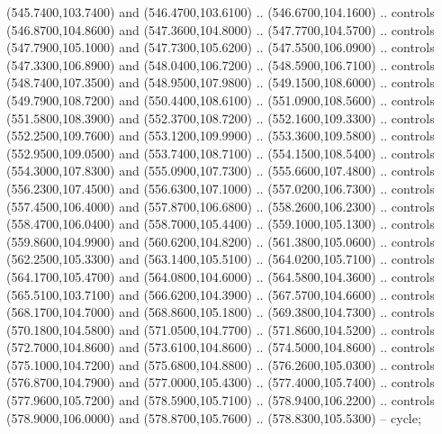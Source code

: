 {\begin{scope}[y=0.80pt, x=0.80pt, yscale=-1, xscale=1, inner sep=0pt, outer sep=0pt, #1]
      (545.7400,103.7400) and (546.4700,103.6100) .. (546.6700,104.1600) .. controls
      (546.8700,104.8600) and (547.3600,104.8000) .. (547.7700,104.5700) .. controls
      (547.7900,105.1000) and (547.7300,105.6200) .. (547.5500,106.0900) .. controls
      (547.3300,106.8900) and (548.0400,106.7200) .. (548.5900,106.7100) .. controls
      (548.7400,107.3500) and (548.9500,107.9800) .. (549.1500,108.6000) .. controls
      (549.7900,108.7200) and (550.4400,108.6100) .. (551.0900,108.5600) .. controls
      (551.5800,108.3900) and (552.3700,108.7200) .. (552.1600,109.3300) .. controls
      (552.2500,109.7600) and (553.1200,109.9900) .. (553.3600,109.5800) .. controls
      (552.9500,109.0500) and (553.7400,108.7100) .. (554.1500,108.5400) .. controls
      (554.3000,107.8300) and (555.0900,107.7300) .. (555.6600,107.4800) .. controls
      (556.2300,107.4500) and (556.6300,107.1000) .. (557.0200,106.7300) .. controls
      (557.4500,106.4000) and (557.8700,106.6800) .. (558.2600,106.2300) .. controls
      (558.4700,106.0400) and (558.7000,105.4400) .. (559.1000,105.1300) .. controls
      (559.8600,104.9900) and (560.6200,104.8200) .. (561.3800,105.0600) .. controls
      (562.2500,105.3300) and (563.1400,105.5100) .. (564.0200,105.7100) .. controls
      (564.1700,105.4700) and (564.0800,104.6000) .. (564.5800,104.3600) .. controls
      (565.5100,103.7100) and (566.6200,104.3900) .. (567.5700,104.6600) .. controls
      (568.1700,104.7000) and (568.8600,105.1800) .. (569.3800,104.7300) .. controls
      (570.1800,104.5800) and (571.0500,104.7700) .. (571.8600,104.5200) .. controls
      (572.7000,104.8600) and (573.6100,104.8600) .. (574.5000,104.8600) .. controls
      (575.1000,104.7200) and (575.6800,104.8800) .. (576.2600,105.0300) .. controls
      (576.8700,104.7900) and (577.0000,105.4300) .. (577.4000,105.7400) .. controls
      (577.9600,105.7200) and (578.5900,105.7100) .. (578.9400,106.2200) .. controls
      (578.9000,106.0000) and (578.8700,105.7600) .. (578.8300,105.5300) -- cycle;


\end{scope}}
